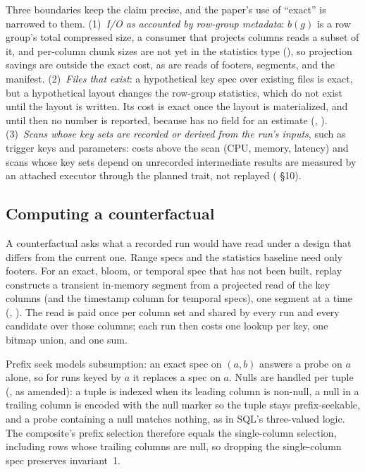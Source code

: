 Three boundaries keep the claim precise, and the paper's use of ``exact'' is
narrowed to them. (1)~\emph{I/O as accounted by row-group metadata}: $b(g)$ is
a row group's total compressed size, a consumer that projects columns reads a
subset of it, and per-column chunk sizes are not yet in the statistics type
(), so projection savings are outside the exact cost, as
are reads of footers, segments, and the manifest. (2)~\emph{Files that exist}:
a hypothetical key spec over existing files is exact, but a hypothetical layout
changes the row-group statistics, which do not exist until the layout is
written. Its cost is exact once the layout is materialized, and until then no
number is reported, because  has no field for an estimate
(, ). (3)~\emph{Scans whose
key sets are recorded or derived from the run's inputs}, such as trigger keys
and parameters: costs above the scan (CPU, memory, latency) and scans whose key
sets depend on unrecorded intermediate results are measured by an attached
executor through the planned  trait, not replayed
( \S10).

\subsection{Computing a counterfactual}\label{sec:counterfactual}

A counterfactual asks what a recorded run would have read under a design that
differs from the current one. Range specs and the statistics baseline need only
footers. For an exact, bloom, or temporal spec that has not been built, replay
constructs a transient in-memory segment from a projected read of the key
columns (and the timestamp column for temporal specs), one segment at a time
(, ). The read is paid once per column set and
shared by every run and every candidate over those columns; each run then costs
one lookup per key, one bitmap union, and one sum.

Prefix seek models subsumption: an exact spec on $(a, b)$ answers a probe on
$a$ alone, so for runs keyed by $a$ it replaces a spec on $a$. Nulls are handled
per tuple (, as amended): a tuple is indexed when its leading column is
non-null, a null in a trailing column is encoded with the null marker so the
tuple stays prefix-seekable, and a probe containing a null matches nothing, as
in SQL's three-valued logic. The composite's prefix selection therefore equals
the single-column selection, including rows whose trailing columns are null, so
dropping the single-column spec preserves invariant~1.

